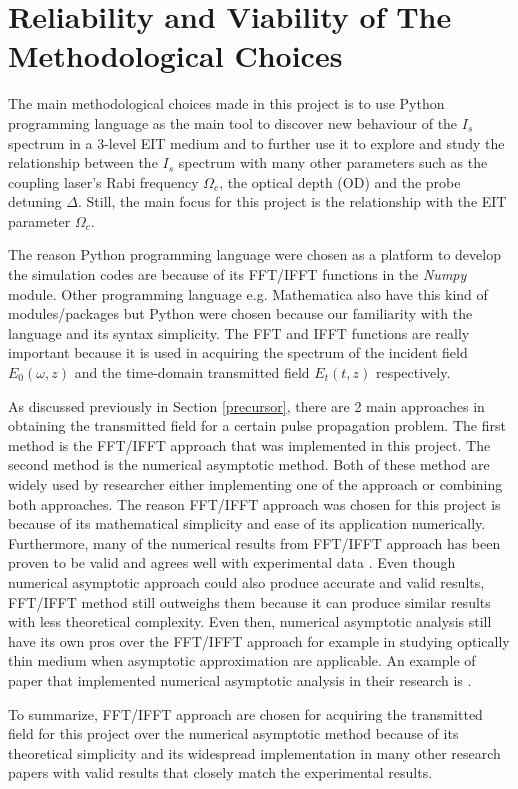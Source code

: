 \section{Reliability and Viability of The Methodological Choices}
The main methodological choices made in this project is to use Python programming language as the main tool to discover new behaviour of the $I_{s}$ spectrum in a 3-level EIT medium and to further use it to explore and study the relationship between the $I_{s}$ spectrum with many other parameters such as the coupling laser's Rabi frequency $\Omega_{c}$, the optical depth (OD) and the probe detuning $\Delta$. Still, the main focus for this project is the relationship with the EIT parameter $\Omega_{c}$.

The reason Python programming language were chosen as a platform to develop the simulation codes are because of its FFT/IFFT functions in the \textit{Numpy} module. Other programming language e.g. Mathematica also have this kind of modules/packages but Python were chosen because our familiarity with the language and its syntax simplicity. The FFT and IFFT functions are really important because it is used in acquiring the spectrum of the incident field $E_{0}(\omega, z)$ and the time-domain transmitted field $E_{t}(t, z)$ respectively.

As discussed previously in Section \ref{precursor}, there are 2 main approaches in obtaining the transmitted field for a certain pulse propagation problem. The first method is the FFT/IFFT approach that was implemented in this project. The second method is the numerical asymptotic method. Both of these method are widely used by researcher either implementing one of the approach or combining both approaches. The reason FFT/IFFT approach was chosen for this project is because of its mathematical simplicity and ease of its application numerically. Furthermore, many of the numerical results from FFT/IFFT approach has been proven to be valid and agrees well with experimental data \cite{Macke2013, Oughstun2010, Jeong2008, jeong2010slow}. Even though numerical asymptotic approach could also produce accurate and valid results, FFT/IFFT method still outweighs them because it can produce similar results with less theoretical complexity. Even then, numerical asymptotic analysis still have its own pros over the FFT/IFFT approach for example in studying optically thin medium when asymptotic approximation are applicable. An example of paper that implemented numerical asymptotic analysis in their research is .

To summarize, FFT/IFFT approach are chosen for acquiring the transmitted field for this project over the numerical asymptotic method because of its theoretical simplicity and its widespread implementation in many other research papers with valid results that closely match the experimental results.
